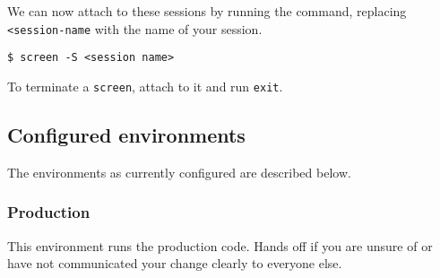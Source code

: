 We can now attach to these sessions by running the command, replacing
\texttt{\textless{}session-name} with the name of your session.

\begin{verbatim}
$ screen -S <session name>
\end{verbatim}

To terminate a \texttt{screen}, attach to it and run \texttt{exit}.

\subsection{Configured environments}\label{sec:configured-environments}

The environments as currently configured are described below.

\subsubsection{Production}\label{sec:production}

This environment runs the production code. Hands off if you are unsure
of or have not communicated your change clearly to everyone else.

